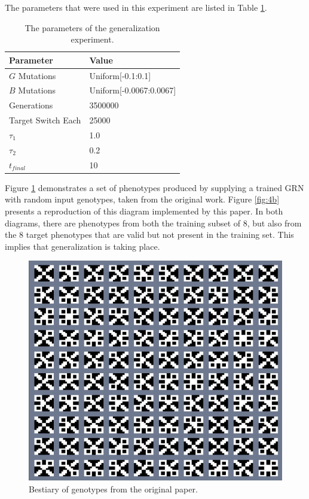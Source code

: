 \documentclass[twocolumn,a4paper,11pt]{article}
\begin{document}
    The parameters that were used in this experiment are listed in Table \ref{tbl:ex-g-param}.
    \begin{table}[h]
        \centering
        \begin{tabular}{l|l}
        Parameter & Value \\ \hline
        $G$ Mutations & Uniform[-0.1:0.1] \\
        $B$ Mutations & Uniform[-0.0067:0.0067] \\
        Generations & 3500000 \\
        Target Switch Each & 25000 \\
        $\tau_1$ & 1.0 \\
        $\tau_2$ & 0.2 \\
        $t_{final}$ & 10
        \end{tabular}
        \caption{The parameters of the generalization experiment.} \label{tbl:ex-g-param}
    \end{table}

    Figure \ref{fig:4b-orig} demonstrates a set of phenotypes produced by supplying a trained GRN with random input genotypes, taken from the original work. Figure \ref{fig:4b} presents a reproduction of this diagram implemented by this paper. In both diagrams, there are phenotypes from both the training subset of 8, but also from the 8 target phenotypes that are valid but not present in the training set. This implies that generalization is taking place.

    \begin{figure}[h]
        \centering
        \includegraphics[width=0.7\linewidth]{orig_img/fig4b.png}
        \caption{Bestiary of genotypes from the original paper.} \label{fig:4b-orig}
    \end{figure}
\end{document}
